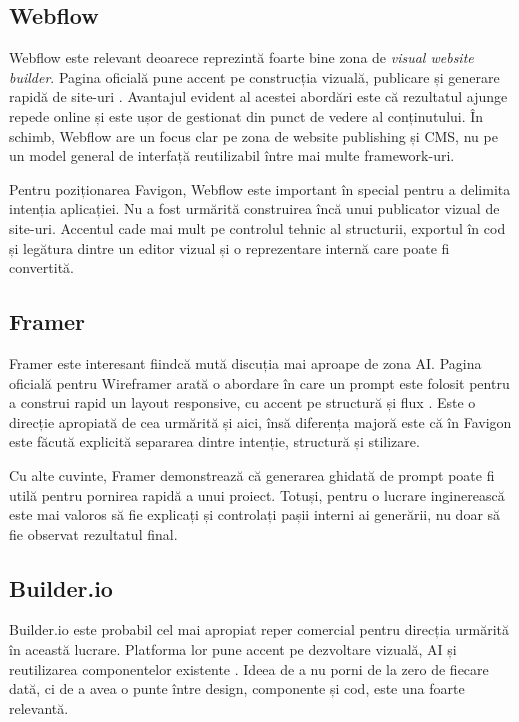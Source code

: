 \subsection{Webflow}

Webflow este relevant deoarece reprezintă foarte bine zona de \textit{visual website builder}. Pagina oficială pune accent pe construcția vizuală, publicare și generare rapidă de site-uri \cite{webflow2026}. Avantajul evident al acestei abordări este că rezultatul ajunge repede online și este ușor de gestionat din punct de vedere al conținutului. În schimb, Webflow are un focus clar pe zona de website publishing și CMS, nu pe un model general de interfață reutilizabil între mai multe framework-uri.

Pentru poziționarea Favigon, Webflow este important în special pentru a delimita intenția aplicației. Nu a fost urmărită construirea încă unui publicator vizual de site-uri. Accentul cade mai mult pe controlul tehnic al structurii, exportul în cod și legătura dintre un editor vizual și o reprezentare internă care poate fi convertită.

\subsection{Framer}

Framer este interesant fiindcă mută discuția mai aproape de zona AI. Pagina oficială pentru Wireframer arată o abordare în care un prompt este folosit pentru a construi rapid un layout responsive, cu accent pe structură și flux \cite{framerWireframer2026}. Este o direcție apropiată de cea urmărită și aici, însă diferența majoră este că în Favigon este făcută explicită separarea dintre intenție, structură și stilizare.

Cu alte cuvinte, Framer demonstrează că generarea ghidată de prompt poate fi utilă pentru pornirea rapidă a unui proiect. Totuși, pentru o lucrare inginerească este mai valoros să fie explicați și controlați pașii interni ai generării, nu doar să fie observat rezultatul final.

\subsection{Builder.io}

Builder.io este probabil cel mai apropiat reper comercial pentru direcția urmărită în această lucrare. Platforma lor pune accent pe dezvoltare vizuală, AI și reutilizarea componentelor existente \cite{builderPlatform2026,builderAi2026}. Ideea de a nu porni de la zero de fiecare dată, ci de a avea o punte între design, componente și cod, este una foarte relevantă.

